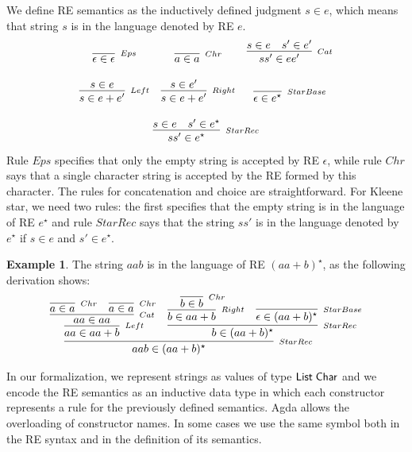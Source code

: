 \documentclass[fleqn,10pt]{SelfArx} %
\theoremstyle{definition}
\newtheorem{Example}{Example}
\newcommand{\D}[1]{\blue{\mathsf{#1}}}
\begin{document}
We define RE semantics as the inductively defined judgment $s \in e$, 
which means that string $s$ is in the language denoted by RE $e$.
\[
    \begin{array}{ccc}
        \infer[_{Eps}]{\epsilon \in \epsilon}{}
        & 
        \infer[_{Chr}]{a \in a}{}
        &
        \infer[_{Cat}]{ss' \in ee'}
                      {s \in e & s' \in e'} \\ \\
        \infer[_{Left}]{s \in e + e'}
                       {s \in e} & 
        \infer[_{Right}]{s \in e + e'}
                        {s \in e'} &
        \infer[_{StarBase}]{\epsilon \in e^\star}{} \\ \\ 
        \multicolumn{3}{c}{
            \infer[_{StarRec}]
                  {ss' \in e^\star}
                  {s \in e & s' \in e^\star}
        }
    \end{array}
\]
Rule $Eps$ specifies that only the empty string is accepted by RE $\epsilon$, while 
rule $Chr$ says that a single character string is accepted by the RE formed by this
character. The rules for concatenation and choice are straightforward. For Kleene star, 
we need two rules: the first specifies that the empty string is in the language of RE $e^\star$ and 
rule $StarRec$ says that the string $ss'$ is in the language denoted by $e^\star$ if 
$s \in e$ and $s' \in e^\star$.

\begin{Example}
    The string $aab$ is in the language of RE $(aa + b)^\star$, as the following derivation shows:
    \[
        \infer[_{StarRec}]{aab \in (aa + b)^\star}
              {
                  \infer[_{Left}]{aa \in aa + b}
                        {
                            \infer[_{Cat}]{aa \in aa}
                                  {
                                      \infer[_{Chr}]{a \in a}{} &
                                      \infer[_{Chr}]{a \in a}{}
                                  }
                        }
                  & 
                  \infer[_{StarRec}]{b \in (aa + b)^\star}
                        {
                            \infer[_{Right}]{b \in aa + b}
                                  {
                                      \infer[_{Chr}]{b \in b}{}
                                  }
                            & 
                            \infer[_{StarBase}]{\epsilon \in (aa + b)^\star}{}
                        }
              }
    \]
\end{Example}
In our formalization, we represent strings as values of type \ensuremath{\D{List}\;\D{Char}} and we encode the RE semantics
as an inductive data type in which each constructor represents a rule for the previously defined semantics.
Agda allows the overloading of constructor names. In some cases we use the same symbol both 
in the RE syntax and in the definition of its semantics.
\end{document}
